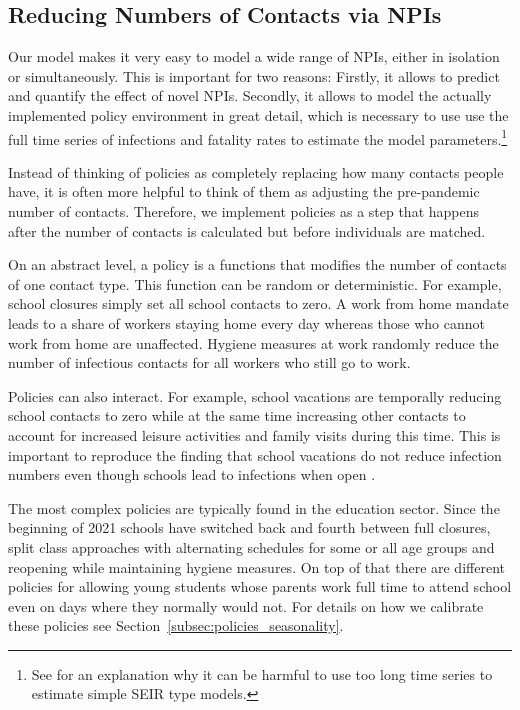 \subsection{Reducing Numbers of Contacts via NPIs}
\label{sec:policies}

Our model makes it very easy to model a wide range of NPIs, either in isolation or
simultaneously. This is important for two reasons: Firstly, it allows to predict and
quantify the effect of novel NPIs. Secondly, it allows to model the actually implemented
policy environment in great detail, which is necessary to use use the full time series
of infections and fatality rates to estimate the model parameters.\footnote{
See \citet{Avery2020} for an explanation why it can be harmful to use too long time
series to estimate simple SEIR type models.}


Instead of thinking of policies as completely replacing how many contacts people have,
it is often more helpful to think of them as adjusting the pre-pandemic number of
contacts. Therefore, we implement policies as a step that happens after the number of contacts is
calculated but before individuals are matched.

On an abstract level, a policy is a functions that modifies the number of contacts of
one contact type. This function can be random or deterministic. For example, school
closures simply set all school contacts to zero. A work from home mandate leads to a
share of workers staying home every day whereas those who cannot work from home are
unaffected. Hygiene measures at work randomly reduce the number of infectious contacts
for all workers who still go to work.

Policies can also interact. For example, school vacations are temporally reducing school
contacts to zero while at the same time increasing other contacts to account for
increased leisure activities and family visits during this time. This is important to
reproduce the finding that school vacations do not reduce infection numbers even though
schools lead to infections when open \citep{Isphording2021}.

The most complex policies are typically found in the education sector. Since the
beginning of 2021 schools have switched back and fourth between full closures,
split class approaches with alternating schedules for some or all age groups and
reopening while maintaining hygiene measures. On top of that there are different
policies for allowing young students whose parents work full time to attend school
even on days where they normally would not. For details on how we calibrate these
policies see Section~\ref{subsec:policies_seasonality}.


